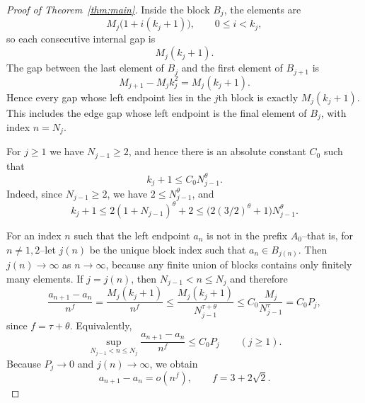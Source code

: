 \documentclass[11pt]{article}
\begin{document}
\begin{proof}[Proof of Theorem~\ref{thm:main}]
Inside the block $B_j$, the elements are
\[
        M_j\bigl(1+i(k_j+1)\bigr),
        \qquad 0\le i<k_j,
\]
so each consecutive internal gap is
\[
        M_j(k_j+1).
\]
The gap between the last element of $B_j$ and the first element of $B_{j+1}$ is
\[
        M_{j+1}-M_j k_j^2=M_j(k_j+1).
\]
Hence every gap whose left endpoint lies in the $j$th block is exactly $M_j(k_j+1)$.  This includes the edge gap whose left endpoint is the final element of $B_j$, with index $n=N_j$.

For $j\ge1$ we have $N_{j-1}\ge2$, and hence there is an absolute constant $C_0$ such that
\[
        k_j+1
        \le C_0N_{j-1}^{\theta}.
\]
Indeed, since $N_{j-1}\ge2$, we have $2\le N_{j-1}^{\theta}$, and
\[
        k_j+1
        \le 2(1+N_{j-1})^\theta+2
        \le \bigl(2(3/2)^\theta+1\bigr)N_{j-1}^\theta.
\]

For an index $n$ such that the left endpoint $a_n$ is not in the prefix $A_0$--that is, for $n\ne1,2$--let $j(n)$ be the unique block index such that $a_n\in B_{j(n)}$.  Then $j(n)\to\infty$ as $n\to\infty$, because any finite union of blocks contains only finitely many elements.  If $j=j(n)$, then $N_{j-1}<n\le N_j$ and therefore
\[
        \frac{a_{n+1}-a_n}{n^f}
        =\frac{M_j(k_j+1)}{n^f}
        \le
        \frac{M_j(k_j+1)}{N_{j-1}^{\tau+\theta}}
        \le C_0\frac{M_j}{N_{j-1}^{\tau}}
        =C_0P_j,
\]
since $f=\tau+\theta$.  Equivalently,
\[
        \sup_{N_{j-1}<n\le N_j}
        \frac{a_{n+1}-a_n}{n^f}
        \le C_0P_j
        \qquad (j\ge1).
\]
Because $P_j\to0$ and $j(n)\to\infty$, we obtain
\[
        a_{n+1}-a_n=o(n^f),
        \qquad
        f=3+2\sqrt2.
\]


\end{proof}
\end{document}
